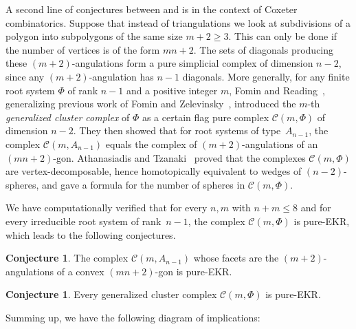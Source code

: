 \documentclass[a4paper,12pt]{amsart}
\newcounter{intege}
\theoremstyle{plain}
\theoremstyle{definition}
\newtheorem{conjecture}[theorem]{Conjecture}
\newcommand{\C}{\mathcal C}
\begin{document}
A second line of conjectures between   and  is in the context of Coxeter combinatorics.
Suppose that instead of triangulations we look at subdivisions of a polygon into subpolygons of the same size $m+2\ge 3$. This can only be done if the number of vertices is of the form $mn+2$.
The sets of diagonals producing these $(m+2)$-angulations form a pure simplicial complex of dimension $n-2$, since any $(m+2)$-angulation has $n-1$ diagonals.
More generally, for any finite root system $\Phi$ of rank $n-1$ and a positive integer $m$, Fomin and Reading~\cite{FR2005}, generalizing previous work of Fomin and Zelevinsky~\cite{FZ2003}, introduced the $m$-th \emph{generalized cluster complex} of $\Phi$ as a certain flag pure complex $\C(m,\Phi)$ of dimension $n-2$. They then showed that for root systems of type~$A_{n-1}$, the complex $\C(m,A_{n-1})$ equals the complex of $(m+2)$-angulations of an $(mn+2)$-gon.
Athanasiadis and Tzanaki~\cite{AT2008} proved that the complexes $\C(m,\Phi)$ are vertex-decomposable, hence homotopically equivalent to wedges of $(n-2)$-spheres, and gave a formula for the number of spheres in $\C(m,\Phi)$.

\medskip

We have computationally verified that for every $n,m$ with $n+m \leq 8$ and for every irreducible root system of rank~$n-1$, the complex $\C(m,\Phi)$ is pure-EKR, which leads to the following conjectures.

\begin{conjecture}
\label{conj:m_angulations}
  The complex $\C(m,A_{n-1})$ whose facets are the $(m+2)$-angulations of a convex $(mn+2)$-gon is pure-EKR.
\end{conjecture}

\begin{conjecture}
\label{conj:cluster}
  Every generalized cluster complex $\C(m, \Phi)$ is pure-EKR.
\end{conjecture}

Summing up, we have the following diagram of implications:

\begin{center}
\end{center}
\end{document}
